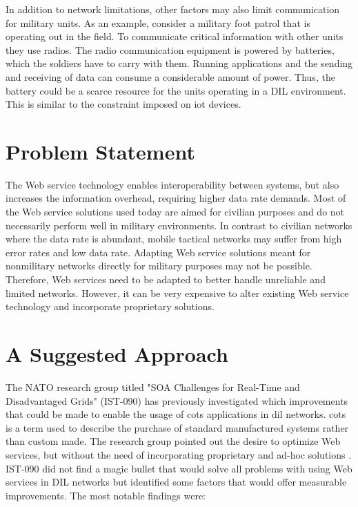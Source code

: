 In addition to network limitations, other factors may also limit communication
for military units. As an example, consider a military foot patrol that is
operating out in the field. To communicate critical information with other units
they use radios. The radio communication equipment is powered by batteries,
which the soldiers have to carry with them. Running applications and the sending
and receiving of data can consume a considerable amount of power. Thus, the
battery could be a scarce resource for the units operating in a DIL environment.
This is similar to the constraint imposed on \gls{iot} devices.


\section{Problem Statement}
\label{section:problem-statement}

The Web service technology enables interoperability between systems, but also
increases the information overhead, requiring higher data rate demands. Most of
the Web service solutions used today are aimed for civilian purposes and do not
necessarily perform well in military environments. In contrast to civilian
networks where the data rate is abundant, mobile tactical networks may suffer
from high error rates and low data rate. Adapting Web service solutions meant
for nonmilitary networks directly for military purposes may not be possible.
Therefore, Web services need to be adapted to better handle unreliable and
limited networks. However, it can be very expensive to alter existing Web
service technology and incorporate proprietary solutions.



\section{A Suggested Approach}
\label{section:hypothesis}

The NATO research group titled "SOA Challenges for Real-Time and Disadvantaged
Grids" (IST-090) has previously investigated which improvements that could be
made to enable the usage of \gls{cots} applications in \gls{dil} networks.
\Gls{cots} is a term used to describe the purchase of standard manufactured
systems rather than custom made. The research group pointed out the desire to
optimize Web services, but without the need of incorporating proprietary and
ad-hoc solutions \cite{ist-090}. IST-090 did not find a magic bullet that would
solve all problems with using Web services in DIL networks but identified some
factors that would offer measurable improvements. The most notable findings
were:

